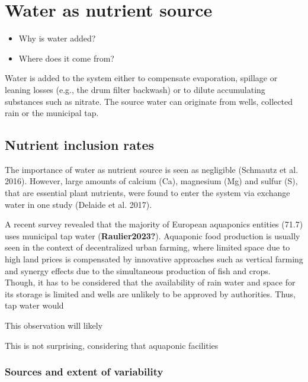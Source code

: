 \documentclass[preprint, 3p,
authoryear]{elsarticle} %
\providecommand{\tightlist}{%
  \setlength{\itemsep}{0pt}\setlength{\parskip}{0pt}}
\begin{document}
\hypertarget{water-as-nutrient-source}{%
\section{Water as nutrient source}\label{water-as-nutrient-source}}

\begin{itemize}
\tightlist
\item
  Why is water added?
\item
  Where does it come from?
\end{itemize}

Water is added to the system either to compensate evaporation, spillage
or leaning losses (e.g., the drum filter backwash) or to dilute
accumulating substances such as nitrate. The source water can originate
from wells, collected rain or the municipal tap.

\hypertarget{nutrient-inclusion-rates-1}{%
\subsection{Nutrient inclusion rates}\label{nutrient-inclusion-rates-1}}

The importance of water as nutrient source is seen as negligible
(Schmautz et al. 2016). However, large amounts of calcium (Ca),
magnesium (Mg) and sulfur (S), that are essential plant nutrients, were
found to enter the system via exchange water in one study (Delaide et
al. 2017).

A recent survey revealed that the majority of European aquaponics
entities (\SI{71.7}{\p}) uses municipal tap water
(\textbf{Raulier2023?}). Aquaponic food production is usually seen in
the context of decentralized urban farming, where limited space due to
high land prices is compensated by innovative approaches such as
vertical farming and synergy effects due to the simultaneous production
of fish and crops. Though, it has to be considered that the availability
of rain water and space for its storage is limited and wells are
unlikely to be approved by authorities. Thus, tap water would

This observation will likely

This is not surprising, considering that aquaponic facilities

\hypertarget{sources-and-extent-of-variability-1}{%
\subsubsection{Sources and extent of
variability}\label{sources-and-extent-of-variability-1}}
\end{document}
